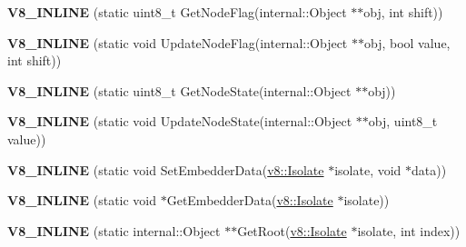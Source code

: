 \begin{DoxyCompactItemize}
\item 
\hypertarget{classv8_1_1internal_1_1_internals_acc75beba18c48011d4f64f08cd590812}{}{\bfseries V8\+\_\+\+I\+N\+L\+I\+N\+E} (static uint8\+\_\+t Get\+Node\+Flag(internal\+::\+Object $\ast$$\ast$obj, int shift))\label{classv8_1_1internal_1_1_internals_acc75beba18c48011d4f64f08cd590812}

\item 
\hypertarget{classv8_1_1internal_1_1_internals_abd298c1791d3e9373a814deb9c717f62}{}{\bfseries V8\+\_\+\+I\+N\+L\+I\+N\+E} (static void Update\+Node\+Flag(internal\+::\+Object $\ast$$\ast$obj, bool value, int shift))\label{classv8_1_1internal_1_1_internals_abd298c1791d3e9373a814deb9c717f62}

\item 
\hypertarget{classv8_1_1internal_1_1_internals_a98601669f2eada958867d2d6dd036bbb}{}{\bfseries V8\+\_\+\+I\+N\+L\+I\+N\+E} (static uint8\+\_\+t Get\+Node\+State(internal\+::\+Object $\ast$$\ast$obj))\label{classv8_1_1internal_1_1_internals_a98601669f2eada958867d2d6dd036bbb}

\item 
\hypertarget{classv8_1_1internal_1_1_internals_a8d572dfc7c7b714ed08e9b0a5985dae0}{}{\bfseries V8\+\_\+\+I\+N\+L\+I\+N\+E} (static void Update\+Node\+State(internal\+::\+Object $\ast$$\ast$obj, uint8\+\_\+t value))\label{classv8_1_1internal_1_1_internals_a8d572dfc7c7b714ed08e9b0a5985dae0}

\item 
\hypertarget{classv8_1_1internal_1_1_internals_ac6230ed520366326b168af58dc10dbd3}{}{\bfseries V8\+\_\+\+I\+N\+L\+I\+N\+E} (static void Set\+Embedder\+Data(\hyperlink{classv8_1_1_isolate}{v8\+::\+Isolate} $\ast$isolate, void $\ast$data))\label{classv8_1_1internal_1_1_internals_ac6230ed520366326b168af58dc10dbd3}

\item 
\hypertarget{classv8_1_1internal_1_1_internals_acb49ba730133da0d6a473f199a29f2d8}{}{\bfseries V8\+\_\+\+I\+N\+L\+I\+N\+E} (static void $\ast$Get\+Embedder\+Data(\hyperlink{classv8_1_1_isolate}{v8\+::\+Isolate} $\ast$isolate))\label{classv8_1_1internal_1_1_internals_acb49ba730133da0d6a473f199a29f2d8}

\item 
\hypertarget{classv8_1_1internal_1_1_internals_a43d16f21d492bab553ecbe80930b7cf8}{}{\bfseries V8\+\_\+\+I\+N\+L\+I\+N\+E} (static internal\+::\+Object $\ast$$\ast$Get\+Root(\hyperlink{classv8_1_1_isolate}{v8\+::\+Isolate} $\ast$isolate, int index))\label{classv8_1_1internal_1_1_internals_a43d16f21d492bab553ecbe80930b7cf8}


\end{DoxyCompactItemize}
